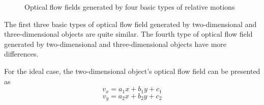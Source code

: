\documentclass[journal]{IEEEtran}
\begin{document}
\begin{figure}[!t]
\centering
{}
\caption{Optical flow fields generated by four basic types of relative motions}
\label{fig_C_1}
\end{figure}

The first three basic types of optical flow field generated by two-dimensional and three-dimensional objects are quite similar. The fourth type of optical flow field generated by two-dimensional and three-dimensional objects have more differences.

For the ideal case, the two-dimensional object's optical flow field can be presented as
\begin{equation}
\label{eq_C_1}
v_x = a_1x + b_1y + c_1
\end{equation}
\begin{equation}
\label{eq_C_2}
v_y = a_2x + b_2y + c_2
\end{equation}
\end{document}
